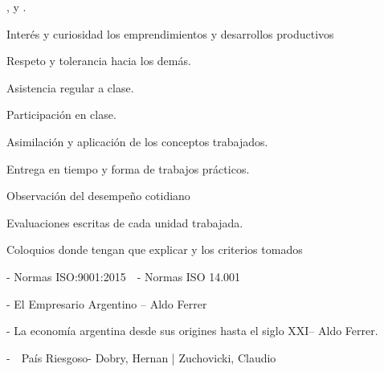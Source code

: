 \vspace{8pt}
,  y .

\vspace{16pt}

\begin{guiones}
  \item Interés y curiosidad los emprendimientos y desarrollos productivos
  \item Respeto y tolerancia hacia los demás.
  \item Asistencia regular a clase.
  \item Participación en clase.
  \item Asimilación y aplicación de los conceptos trabajados.
\end{guiones}

\vspace{8pt}

\begin{guiones}[itemsep=8pt]
  \item Entrega en tiempo y forma de trabajos prácticos.
  \item Observación del desempeño cotidiano
  \item[-] Evaluaciones escritas de cada unidad trabajada.\vspace{-8pt}
  \item Coloquios donde tengan que explicar y los criterios tomados
\end{guiones}

\newpage
{}

\vspace{8pt}
- Normas ISO:9001:2015\ \ - Normas ISO 14.001

\vspace{8pt}
- El Empresario Argentino – Aldo Ferrer

\vspace{8pt}
- La economía argentina desde sus origines hasta el siglo XXI– Aldo Ferrer.

\vspace{8pt}
-\ \ País Riesgoso- Dobry, Hernan | Zuchovicki, Claudio

